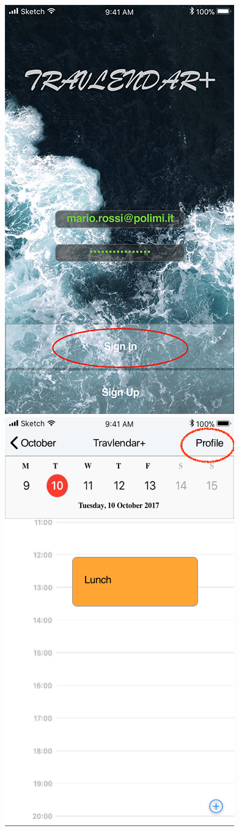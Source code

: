 \begin{figure}[H]
	\includegraphics[scale=0.23]{Images/Interface/Login/2_login_form_filled}
	\hspace{0.5cm}
	\includegraphics[scale=0.23]{Images/Interface/Login/3_calendar+lunch}

\end{figure}
